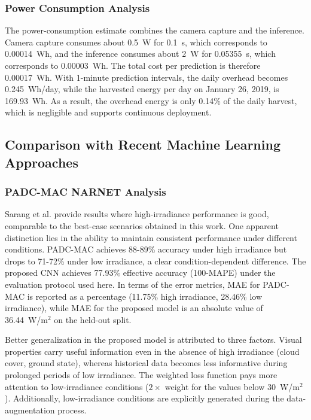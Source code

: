 \documentclass[journal]{IEEEtran}
\begin{document}
\subsubsection{Power Consumption Analysis}
The power-consumption estimate combines the camera capture and the inference. Camera capture consumes about 0.5~W for 0.1~s, which corresponds to 0.00014~Wh, and the inference consumes about 2~W for 0.05355~s, which corresponds to 0.00003~Wh. The total cost per prediction is therefore 0.00017~Wh. With 1-minute prediction intervals, the daily overhead becomes 0.245~Wh/day, while the harvested energy per day on January 26, 2019, is 169.93~Wh. As a result, the overhead energy is only 0.14\% of the daily harvest, which is negligible and supports continuous deployment.

\subsection{Comparison with Recent Machine Learning Approaches}

\subsubsection{PADC-MAC NARNET Analysis}
Sarang et al. \cite{ref11} provide results where high-irradiance performance is good, comparable to the best-case scenarios obtained in this work. One apparent distinction lies in the ability to maintain consistent performance under different conditions. PADC-MAC achieves 88-89\% accuracy under high irradiance but drops to 71-72\% under low irradiance, a clear condition-dependent difference. The proposed CNN achieves 77.93\% effective accuracy (100-MAPE) under the evaluation protocol used here. In terms of the error metrics, MAE for PADC-MAC is reported as a percentage (11.75\% high irradiance, 28.46\% low irradiance), while MAE for the proposed model is an absolute value of 36.44~W/m$^2$ on the held-out split.

Better generalization in the proposed model is attributed to three factors. Visual properties carry useful information even in the absence of high irradiance (cloud cover, ground state), whereas historical data becomes less informative during prolonged periods of low irradiance. The weighted loss function pays more attention to low-irradiance conditions ($2\times$ weight for the values below 30~W/m$^2$). Additionally, low-irradiance conditions are explicitly generated during the data-augmentation process.
\end{document}
